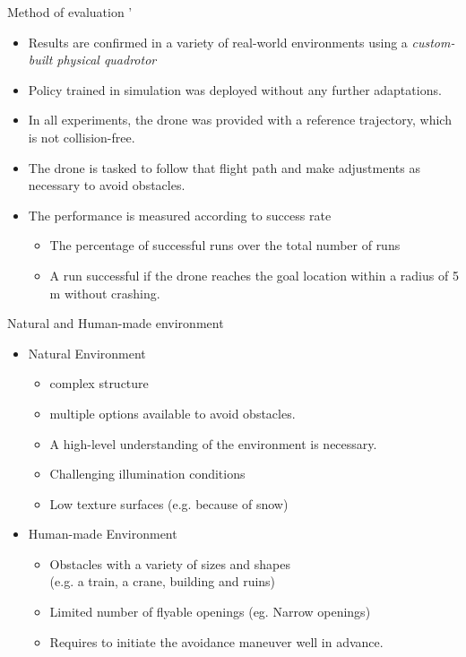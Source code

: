 \documentclass{beamer}
\begin{document}
\begin{frame}{Method of evaluation}
	'\begin{itemize}
		\item Results are confirmed in a variety of real-world environments using a \textit{custom-built physical quadrotor}
		\item Policy trained in simulation was deployed without any further adaptations.
		\item In all experiments, the drone was provided with a reference trajectory, which is not collision-free.
		\item The drone is tasked to follow that flight path and make adjustments as necessary to avoid obstacles.
		\item The performance is measured according to success rate
		\begin{itemize}
			\item The percentage of successful runs over the total number of runs
			\item A run successful if the drone reaches the goal location within a radius of 5 m without crashing.
		\end{itemize} 
	\end{itemize}
\end{frame}

\begin{frame}{Natural and Human-made environment}
	\begin{itemize}
		\item Natural Environment
		\begin{itemize}
			\item complex structure
			\item multiple options available to avoid obstacles. 
			\item A high-level understanding of the environment is necessary.
			\item Challenging illumination conditions
			\item Low texture surfaces (e.g. because of snow)
		\end{itemize}
	
		\item Human-made Environment
		\begin{itemize}
			\item Obstacles with a variety of sizes and shapes \\
			(e.g. a train, a crane, building and ruins)
			\item Limited number of flyable openings (eg. Narrow openings)
			\item Requires to initiate the avoidance maneuver well in advance.
		\end{itemize}
	\end{itemize}	
\end{frame}
\end{document}
